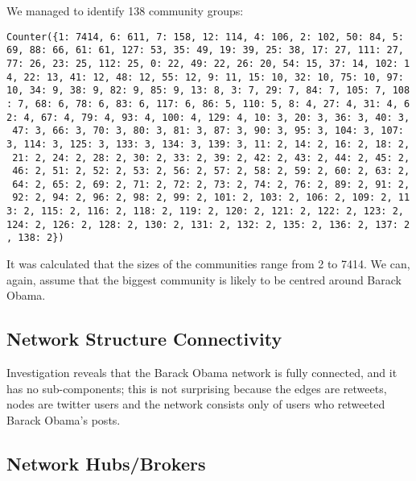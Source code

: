 \documentclass[
]{article}
\begin{document}
We managed to identify 138 community groups:

\texttt{Counter(\{1:\ 7414,\ 6:\ 611,\ 7:\ 158,\ 12:\ 114,\ 4:\ 106,\ 2:\ 102,\ 50:\ 84,\ 5:\ 69,\ 88:\ 66,\ 61:\ 61,\ 127:\ 53,\ 35:\ 49,\ 19:\ 39,\ 25:\ 38,\ 17:\ 27,\ 111:\ 27,\ 77:\ 26,\ 23:\ 25,\ 112:\ 25,\ 0:\ 22,\ 49:\ 22,\ 26:\ 20,\ 54:\ 15,\ 37:\ 14,\ 102:\ 14,\ 22:\ 13,\ 41:\ 12,\ 48:\ 12,\ 55:\ 12,\ 9:\ 11,\ 15:\ 10,\ 32:\ 10,\ 75:\ 10,\ 97:\ 10,\ 34:\ 9,\ 38:\ 9,\ 82:\ 9,\ 85:\ 9,\ 13:\ 8,\ 3:\ 7,\ 29:\ 7,\ 84:\ 7,\ 105:\ 7,\ 108:\ 7,\ 68:\ 6,\ 78:\ 6,\ 83:\ 6,\ 117:\ 6,\ 86:\ 5,\ 110:\ 5,\ 8:\ 4,\ 27:\ 4,\ 31:\ 4,\ 62:\ 4,\ 67:\ 4,\ 79:\ 4,\ 93:\ 4,\ 100:\ 4,\ 129:\ 4,\ 10:\ 3,\ 20:\ 3,\ 36:\ 3,\ 40:\ 3,\ 47:\ 3,\ 66:\ 3,\ 70:\ 3,\ 80:\ 3,\ 81:\ 3,\ 87:\ 3,\ 90:\ 3,\ 95:\ 3,\ 104:\ 3,\ 107:\ 3,\ 114:\ 3,\ 125:\ 3,\ 133:\ 3,\ 134:\ 3,\ 139:\ 3,\ 11:\ 2,\ 14:\ 2,\ 16:\ 2,\ 18:\ 2,\ 21:\ 2,\ 24:\ 2,\ 28:\ 2,\ 30:\ 2,\ 33:\ 2,\ 39:\ 2,\ 42:\ 2,\ 43:\ 2,\ 44:\ 2,\ 45:\ 2,\ 46:\ 2,\ 51:\ 2,\ 52:\ 2,\ 53:\ 2,\ 56:\ 2,\ 57:\ 2,\ 58:\ 2,\ 59:\ 2,\ 60:\ 2,\ 63:\ 2,\ 64:\ 2,\ 65:\ 2,\ 69:\ 2,\ 71:\ 2,\ 72:\ 2,\ 73:\ 2,\ 74:\ 2,\ 76:\ 2,\ 89:\ 2,\ 91:\ 2,\ 92:\ 2,\ 94:\ 2,\ 96:\ 2,\ 98:\ 2,\ 99:\ 2,\ 101:\ 2,\ 103:\ 2,\ 106:\ 2,\ 109:\ 2,\ 113:\ 2,\ 115:\ 2,\ 116:\ 2,\ 118:\ 2,\ 119:\ 2,\ 120:\ 2,\ 121:\ 2,\ 122:\ 2,\ 123:\ 2,\ 124:\ 2,\ 126:\ 2,\ 128:\ 2,\ 130:\ 2,\ 131:\ 2,\ 132:\ 2,\ 135:\ 2,\ 136:\ 2,\ 137:\ 2,\ 138:\ 2\})}

It was calculated that the sizes of the communities range from 2 to
7414. We can, again, assume that the biggest community is likely to be
centred around Barack Obama.

\hypertarget{network-structure-connectivity}{%
\subsection{Network Structure
Connectivity}\label{network-structure-connectivity}}

Investigation reveals that the Barack Obama network is fully connected,
and it has no sub-components; this is not surprising because the edges
are retweets, nodes are twitter users and the network consists only of
users who retweeted Barack Obama's posts.

\hypertarget{network-hubsbrokers}{%
\subsection{Network Hubs/Brokers}\label{network-hubsbrokers}}
\end{document}
